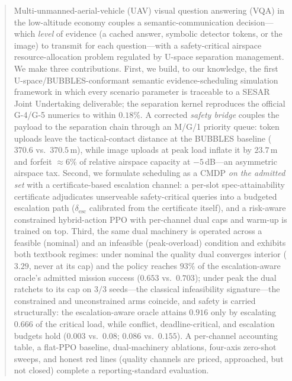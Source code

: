 \documentclass[journal]{IEEEtran}
\begin{document}
\begin{abstract}
Multi-unmanned-aerial-vehicle (UAV) visual question answering (VQA) in the
low-altitude economy couples a semantic-communication decision---which
\emph{level} of evidence (a cached answer, symbolic detector tokens, or the
image) to transmit for each question---with a safety-critical airspace
resource-allocation problem regulated by U-space separation management. We
make three contributions. First, we build, to our knowledge, the first
U-space/BUBBLES-conformant semantic evidence-scheduling simulation
framework in which every scenario parameter is traceable to a SESAR
Joint Undertaking deliverable; the separation kernel reproduces the
official G-4/G-5 numerics to within $0.18\%$. A corrected \emph{safety
bridge} couples the payload to the separation chain through an M/G/1
priority queue: token uploads leave the tactical-contact distance at the
BUBBLES baseline ($370.6$ vs.\ $370.5$\,m), while image uploads at peak
load inflate it by $23.7$\,m and forfeit $\approx\!6\%$ of relative
airspace capacity at $-5$\,dB---an asymmetric airspace tax. Second, we
formulate scheduling as a CMDP \emph{on the admitted set} with a
certificate-based escalation channel: a per-slot spec-attainability
certificate adjudicates unserveable safety-critical queries into a
budgeted escalation path ($\delta_{\mathrm{esc}}$ calibrated from the
certificate itself), and a risk-aware constrained hybrid-action PPO with
per-channel dual caps and warm-up is trained on top. Third, the same dual
machinery is operated across a feasible (nominal) and an infeasible
(peak-overload) condition and exhibits both textbook regimes: under
nominal the quality dual converges interior ($3.29$, never at its cap)
and the policy reaches $93\%$ of the escalation-aware oracle's admitted
mission success ($0.653$ vs.\ $0.703$); under peak the dual ratchets to
its cap on $3/3$ seeds---the classical infeasibility signature---the
constrained and unconstrained arms coincide, and safety is carried
structurally: the escalation-aware oracle attains $0.916$ only by
escalating $0.666$ of the critical load, while conflict, deadline-critical,
and escalation budgets hold ($0.003$ vs.\ $0.08$; $0.086$ vs.\ $0.155$).
A per-channel accounting table, a flat-PPO baseline, dual-machinery
ablations, four-axis zero-shot sweeps, and honest red lines (quality
channels are priced, approached, but not closed) complete a
reporting-standard evaluation.
\end{abstract}
\end{document}
